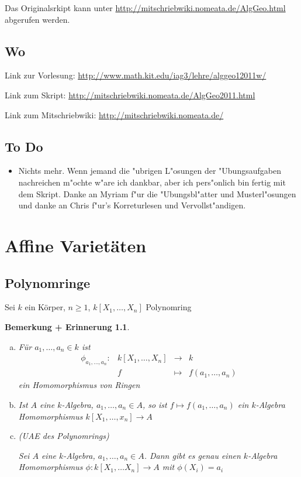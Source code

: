\documentclass[a4paper, 12pt, numbers=noendperiod, chapterprefix=true, headsepline]{scrbook}
\theoremstyle{break}
\newtheorem{BemErinn}[Def]{Bemerkung + Erinnerung}
\theoremstyle{nonumberbreak}
\theoremstyle{nonumberplain}
\begin{document}
Das Originalsrkipt kann unter \url{http://mitschriebwiki.nomeata.de/AlgGeo.html} abgerufen werden.

\section*{Wo}
Link zur Vorlesung: \url{http://www.math.kit.edu/iag3/lehre/alggeo12011w/}

Link zum Skript: \url{http://mitschriebwiki.nomeata.de/AlgGeo2011.html}

Link zum Mitschriebwiki: \url{http://mitschriebwiki.nomeata.de/}

\section*{To Do}\begin{itemize}
\item Nichts mehr. Wenn jemand die "ubrigen L"osungen der "Ubungsaufgaben nachreichen m"ochte w"are ich dankbar, aber ich pers"onlich bin fertig mit dem Skript. Danke an Myriam f"ur die "Ubungsbl"atter und Musterl"osungen und danke an Chris f"ur's Korreturlesen und Vervollst"andigen.
\end{itemize}


\chapter{Affine Variet\"aten}

\section{Polynomringe}

Sei $k$ ein K\"orper, $n \geq 1$, $k[X_1,\dots,X_n]$ Polynomring

\begin{BemErinn}\label{bemerinn:1.1}
\begin{enumerate}[a)]
\item F\"ur $a_1, \dots, a_n \in k$ ist
	\[\begin{array}{lccc}
		\phi_{a_1,\dots,a_n}: &k[X_1, \dots, X_n] &\to& k \\
		&f &\mapsto& f(a_1, \dots, a_n)
	\end{array}\]
	ein Homomorphismus von Ringen
	
\item Ist $A$ eine $k$-Algebra, $a_1,\dots, a_n \in A$, so ist $f \mapsto f(a_1, \dots,a_n)$ ein $k$-Algebra Homomorphismus $k[X_1,\dots,x_n] \to A$
	
\item (UAE des Polynomrings)

	Sei $A$ eine $k$-Algebra, $a_1,\dots,a_n\in A$. Dann gibt es genau einen $k$-Algebra Homomorphismus $\phi:k[X_1,\dots X_n] \to A$ mit $\phi(X_i) = a_i$\label{bemerinn:1.1.c}
\end{enumerate}
\end{BemErinn}
\end{document}
